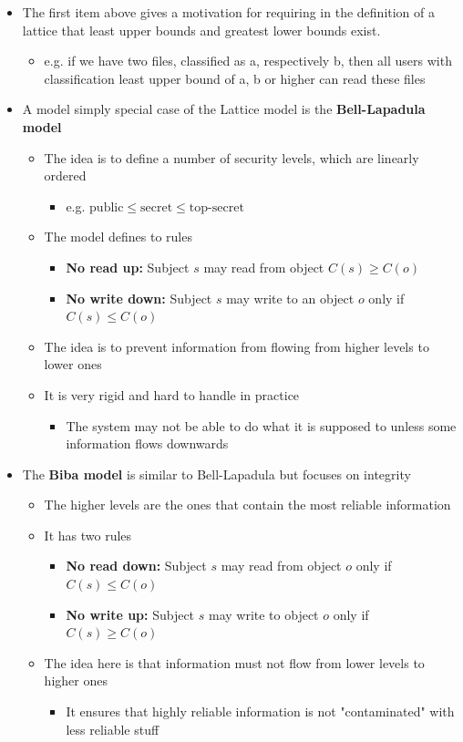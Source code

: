 \documentclass[11pt]{article}
\begin{document}
\begin{itemize}
\item The first item above gives a motivation for requiring in the definition of a lattice that least upper bounds and greatest lower bounds exist.
\begin{itemize}
\item e.g. if we have two files, classified as a, respectively b, then all users with classification least upper bound of a, b or higher can read these files
\end{itemize}

\item A model simply special case of the Lattice model is the \textbf{Bell-Lapadula model}
\begin{itemize}
\item The idea is to define a number of security levels, which are linearly ordered
\begin{itemize}
\item e.g. \(\text{public} \leq \text{secret} \leq \text{top-secret}\)
\end{itemize}
\item The model defines to rules
\begin{itemize}
\item \textbf{No read up:} Subject \(s\) may read from object \(C(s) \geq C(o)\)
\item \textbf{No write down:} Subject \(s\) may write to an object \(o\) only if \(C(s) \leq C(o)\)
\end{itemize}
\item The idea is to prevent information from flowing from higher levels to lower ones
\item It is very rigid and hard to handle in practice
\begin{itemize}
\item The system may not be able to do what it is supposed to unless some information flows downwards
\end{itemize}
\end{itemize}

\item The \textbf{Biba model} is similar to Bell-Lapadula but focuses on integrity
\begin{itemize}
\item The higher levels are the ones that contain the most reliable information
\item It has two rules
\begin{itemize}
\item \textbf{No read down:} Subject \(s\) may read from object \(o\) only if \(C(s) \leq C(o)\)
\item \textbf{No write up:} Subject \(s\) may write to object \(o\) only if \(C(s) \geq C(o)\)
\end{itemize}
\item The idea here is that information must not flow from lower levels to higher ones
\begin{itemize}
\item It ensures that highly reliable information is not "contaminated" with less reliable stuff
\end{itemize}
\end{itemize}


\end{itemize}
\end{document}
